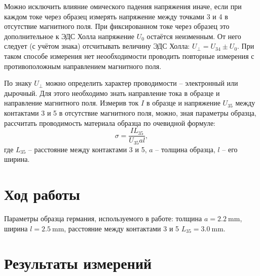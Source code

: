 \documentclass[12pt, a4paper]{article}
\begin{document}
Можно исключить влияние омического падения напряжения иначе, если при каждом токе через образец измерять напряжение между точками 3 и 4 в отсутствие магнитного поля. При фиксированном токе через образец это дополнительное к ЭДС Холла напряжение $U_0$ остаётся неизменным. От него следует (с учётом знака) отсчитывать величину ЭДС Холла: $U_\perp=U_{34}\pm U_0$. При таком способе измерения нет неообходимости проводить повторные измерения с противоположным направлением магнитного поля.

По знаку $U_\perp$ можно определить характер проводимости -- электронный или дырочный. Для этого необходимо знать направление тока в образце и направление магнитного поля. Измерив ток $I$ в образце и напряжение $U_{35}$ между контактами 3 и 5 в отсутствие магнитного поля, можно, зная параметры образца, рассчитать проводимость материала образца по очевидной формуле:
\begin{equation}\sigma=\frac{IL_{35}}{U_{35}al},\label{eq:sigma}\end{equation}
где $L_{35}$ -- расстояние между контактами 3 и 5, $a$ -- толщина образца, $l$ -- его ширина.

\section*{Ход работы}

Параметры образца германия, используемого в работе: толщина $a=2.2~\text{mm}$, ширина $l=2.5~\text{mm}$, расстояние между контактами 3 и 5 $L_{35}=3.0~\text{mm}$.



\section{Результаты измерений}
\end{document}
